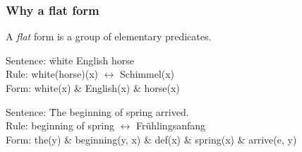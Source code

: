 \documentclass{beamer}
\begin{document}
\begin{frame}
    \frametitle{Why a flat form}

    A \emph{flat} form is a group of elementary predicates.

    \begin{examples}
        \begin{tabbing}
        Sentence:   \= white English horse \\
        Rule:       \> white(horse)(x) $\leftrightarrow$ Schimmel(x) \\
        Form:  \> white(x) \& English(x) \& horse(x)
        \end{tabbing}
    \end{examples}

    \begin{examples}
        \begin{tabbing}
        Sentence:   \= The beginning of spring arrived. \\
        Rule:       \> beginning of spring $\leftrightarrow$ Fr{\"u}hlingsanfang \\
        Form:  \> the(y) \& beginning(y, x) \& def(x) \& spring(x) \& arrive(e, y)
        \end{tabbing}
    \end{examples}

\end{frame}
\end{document}
